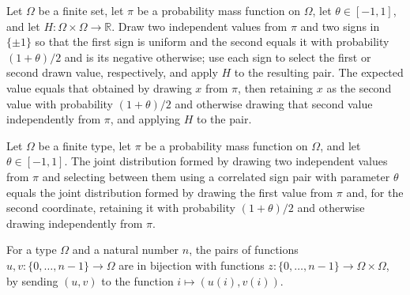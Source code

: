\begin{theorem}
\label{FABL.pmfExpectation_selectorCoordinatePairPMF}
\leanok
{}
Let $\Omega$ be a finite set, let $\pi$ be a probability mass function on $\Omega$, let
$\theta\in[-1,1]$, and let $H:\Omega\times\Omega\to\mathbb{R}$. Draw two independent
values from $\pi$ and two signs in $\{\pm1\}$ so that the first sign is uniform and the
second equals it with probability $(1+\theta)/2$ and is its negative otherwise; use each
sign to select the first or second drawn value, respectively, and apply $H$ to the
resulting pair. The expected value equals that obtained by drawing $x$ from $\pi$, then
retaining $x$ as the second value with probability $(1+\theta)/2$ and otherwise drawing
that second value independently from $\pi$, and applying $H$ to the pair.
\end{theorem}

\begin{theorem}
\label{FABL.selectorCoordinatePairPMF_eq_productRetention}
\leanok
{}
Let $\Omega$ be a finite type, let $\pi$ be a probability mass function on $\Omega$, and
let $\theta\in[-1,1]$. The joint distribution formed by drawing two independent values
from $\pi$ and selecting between them using a correlated sign pair with parameter
$\theta$ equals the joint distribution formed by drawing the first value from $\pi$ and,
for the second coordinate, retaining it with probability $(1+\theta)/2$ and otherwise
drawing independently from $\pi$.
\end{theorem}

\begin{definition}
\label{FABL.productPairCoordinatesEquiv}
\leanok
For a type $\Omega$ and a natural number $n$, the pairs of functions
$u,v:\{0,\ldots,n-1\}\to\Omega$ are in bijection with functions
$z:\{0,\ldots,n-1\}\to\Omega\times\Omega$, by sending $(u,v)$ to the function
$i\mapsto(u(i),v(i))$.
\end{definition}

